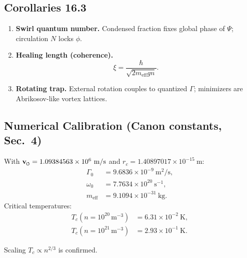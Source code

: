 \documentclass[11pt]{article}
\begin{document}
        \subsection*{Corollaries 16.3}
            \begin{enumerate}
            \item \textbf{Swirl quantum number.}
            Condensed fraction fixes global phase of $\Psi$; circulation $N$ locks $\phi$.

            \item \textbf{Healing length (coherence).}
            \begin{equation}
            \xi = \frac{\hbar}{\sqrt{2 m_{\text{eff}} g n}} .
            \end{equation}

            \item \textbf{Rotating trap.}
            External rotation couples to quantized $\Gamma$; minimizers are Abrikosov-like vortex lattices.
            \end{enumerate}

        \subsection*{Numerical Calibration (Canon constants, Sec.~4)}
            With $\vswirl = 1.09384563\times 10^6~\text{m/s}$
            and $r_c = 1.40897017\times 10^{-15}~\text{m}$:
            \begin{align}
            \Gamma_0 &= 9.6836\times10^{-9}\ \text{m}^2/\text{s}, \\
            \omega_0 &= 7.7634\times10^{20}\ \text{s}^{-1}, \\
            m_{\text{eff}} &= 9.1094\times10^{-31}\ \text{kg}.
            \end{align}
            Critical temperatures:
            \begin{align}
            T_c(n=10^{20}\,\text{m}^{-3}) &= 6.31\times10^{-2}\ \text{K}, \\
            T_c(n=10^{21}\,\text{m}^{-3}) &= 2.93\times10^{-1}\ \text{K}.
            \end{align}

            \noindent Scaling $T_c \propto n^{2/3}$ is confirmed. \checkmark

\end{document}
